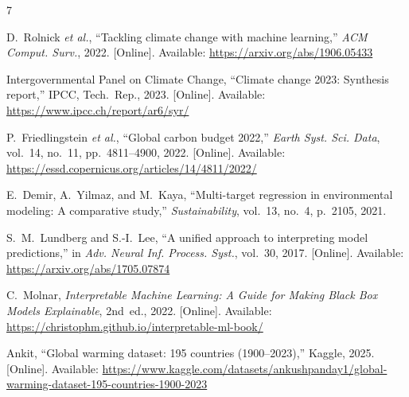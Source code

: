\documentclass[conference]{IEEEtran}
\begin{document}
\begin{thebibliography}{7}

D.~Rolnick \textit{et al.}, ``Tackling climate change with machine learning,''
\textit{ACM Comput. Surv.}, 2022. [Online]. Available:
\url{https://arxiv.org/abs/1906.05433}

Intergovernmental Panel on Climate Change, ``Climate change 2023: Synthesis
report,'' IPCC, Tech.\ Rep., 2023. [Online]. Available:
\url{https://www.ipcc.ch/report/ar6/syr/}

P.~Friedlingstein \textit{et al.}, ``Global carbon budget 2022,''
\textit{Earth Syst. Sci. Data}, vol.~14, no.~11, pp.~4811--4900, 2022.
[Online]. Available: \url{https://essd.copernicus.org/articles/14/4811/2022/}

E.~Demir, A.~Yilmaz, and M.~Kaya, ``Multi-target regression in environmental
modeling: A comparative study,'' \textit{Sustainability}, vol.~13, no.~4,
p.~2105, 2021.

S.~M.~Lundberg and S.-I.~Lee, ``A unified approach to interpreting model
predictions,'' in \textit{Adv. Neural Inf. Process. Syst.}, vol.~30, 2017.
[Online]. Available: \url{https://arxiv.org/abs/1705.07874}

C.~Molnar, \textit{Interpretable Machine Learning: A Guide for Making Black
Box Models Explainable}, 2nd~ed., 2022. [Online]. Available:
\url{https://christophm.github.io/interpretable-ml-book/}

Ankit, ``Global warming dataset: 195 countries (1900--2023),'' Kaggle, 2025.
[Online]. Available:
\url{https://www.kaggle.com/datasets/ankushpanday1/global-warming-dataset-195-countries-1900-2023}

\end{thebibliography}
\end{document}
